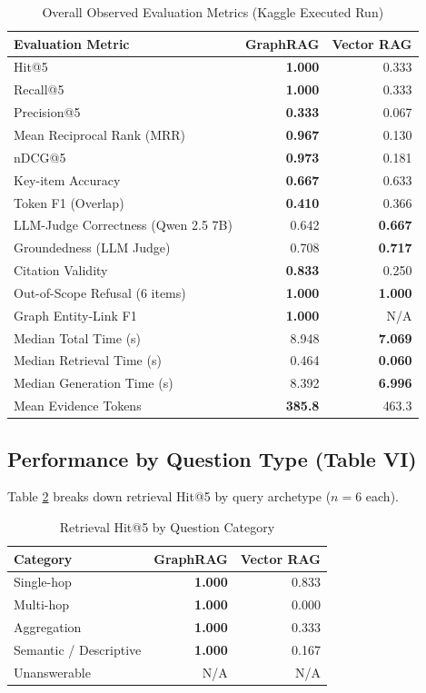 \documentclass[conference]{IEEEtran}
\begin{document}
\begin{table}[htbp]
\caption{Overall Observed Evaluation Metrics (Kaggle Executed Run)}
\label{tab:results}
\centering
\begin{tabularx}{\linewidth}{lrr}
\toprule
\textbf{Evaluation Metric} & \textbf{GraphRAG} & \textbf{Vector RAG} \\
\midrule
Hit@5 & \textbf{1.000} & 0.333 \\
Recall@5 & \textbf{1.000} & 0.333 \\
Precision@5 & \textbf{0.333} & 0.067 \\
Mean Reciprocal Rank (MRR) & \textbf{0.967} & 0.130 \\
nDCG@5 & \textbf{0.973} & 0.181 \\
\midrule
Key-item Accuracy & \textbf{0.667} & 0.633 \\
Token F1 (Overlap) & \textbf{0.410} & 0.366 \\
LLM-Judge Correctness (Qwen 2.5 7B) & 0.642 & \textbf{0.667} \\
Groundedness (LLM Judge) & 0.708 & \textbf{0.717} \\
Citation Validity & \textbf{0.833} & 0.250 \\
Out-of-Scope Refusal (6 items) & \textbf{1.000} & \textbf{1.000} \\
Graph Entity-Link F1 & \textbf{1.000} & N/A \\
\midrule
Median Total Time (s) & 8.948 & \textbf{7.069} \\
Median Retrieval Time (s) & 0.464 & \textbf{0.060} \\
Median Generation Time (s) & 8.392 & \textbf{6.996} \\
Mean Evidence Tokens & \textbf{385.8} & 463.3 \\
\bottomrule
\end{tabularx}
\end{table}

\subsection{Performance by Question Type (Table VI)}
Table \ref{tab:bytype} breaks down retrieval Hit@5 by query archetype ($n=6$ each).

\begin{table}[htbp]
\caption{Retrieval Hit@5 by Question Category}
\label{tab:bytype}
\centering
\begin{tabularx}{\linewidth}{lrr}
\toprule
\textbf{Category} & \textbf{GraphRAG} & \textbf{Vector RAG} \\
\midrule
Single-hop & \textbf{1.000} & 0.833 \\
Multi-hop & \textbf{1.000} & 0.000 \\
Aggregation & \textbf{1.000} & 0.333 \\
Semantic / Descriptive & \textbf{1.000} & 0.167 \\
Unanswerable & N/A & N/A \\
\bottomrule
\end{tabularx}
\end{table}
\end{document}
